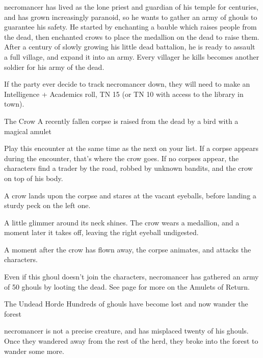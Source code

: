 \begin{multicols}{2}
\sqminitoc

\noindent
\Gls{necromancer} has lived as the lone priest and guardian of his temple for centuries, and has grown increasingly paranoid, so he wants to gather an army of ghouls to guarantee his safety.
He started by enchanting a bauble which raises people from the dead, then enchanted crows to place the medallion on the dead to raise them.
After a century of slowly growing his little dead battalion, he is ready to assault a full village, and expand it into an army.
Every villager he kills becomes another soldier for his army of the dead.

If the party ever decide to track \gls{necromancer} down, they will need to make an Intelligence + Academics roll, TN 15 (or TN 10 with access to the library in town).

{The Crow}%
{A recently fallen corpse is raised from the dead by a bird with a magical amulet}%

Play this encounter at the same time as the next on your list.
If a corpse appears during the encounter, that's where the crow goes.
If no corpses appear, the characters find a trader by the road, robbed by unknown bandits, and the crow on top of his body.

\begin{boxtext}
  A crow lands upon the corpse and stares at the vacant eyeballs, before landing a sturdy peck on the left one.

  A little glimmer around its neck shines.  The crow wears a medallion, and a moment later it takes off, leaving the right eyeball undigested.

\end{boxtext}

A moment after the crow has flown away, the corpse animates, and attacks the characters.


Even if this ghoul doesn't join the characters, \gls{necromancer} has gathered an army of 50 ghouls by looting the dead.
See page \pageref{ghoulNecklace} for more on the Amulets of Return.

{The Undead Horde}%
{Hundreds of ghouls have become lost and now wander the forest}%

\Gls{necromancer} is not a precise creature, and has misplaced twenty of his ghouls.
Once they wandered away from the rest of the herd, they broke into the forest to wander some more.


\end{multicols}
